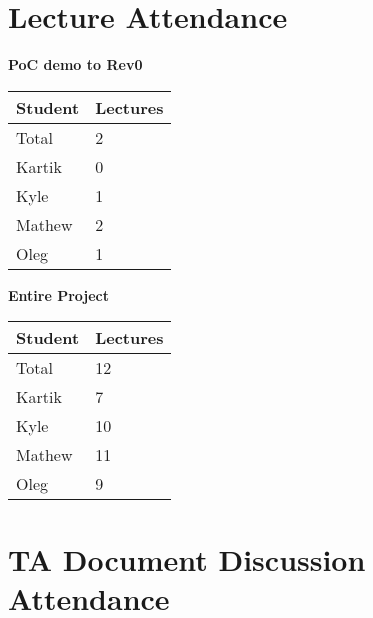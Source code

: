 \documentclass{article}
\begin{document}
\section{Lecture Attendance}




\begin{table}[H]
    \centering
    \textbf{PoC demo to Rev0}\\
    \begin{tabular}{ll}
    \toprule
    \textbf{Student} & \textbf{Lectures}\\
    \midrule
    Total & 2\\
    Kartik & 0\\
    Kyle   & 1\\
    Mathew & 2\\
    Oleg   & 1\\
    \bottomrule
    \end{tabular}
    \end{table}


\begin{table}[H]
\centering
\textbf{Entire Project}\\
\begin{tabular}{ll}
\toprule
\textbf{Student} & \textbf{Lectures}\\
\midrule
Total & 12\\
Kartik & 7\\
Kyle   & 10\\
Mathew & 11\\
Oleg   & 9\\
\bottomrule
\end{tabular}
\end{table}


\section{TA Document Discussion Attendance}

\end{document}

